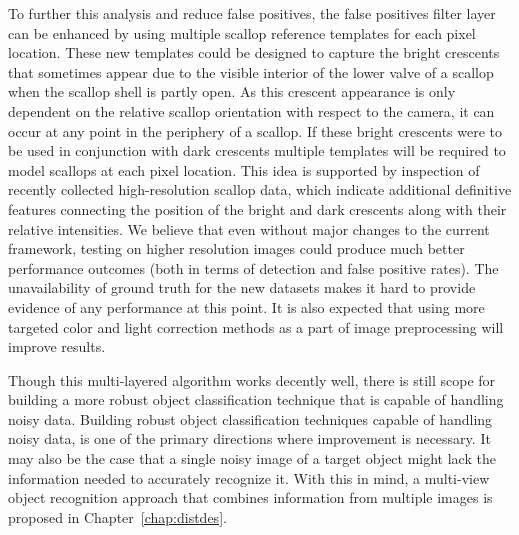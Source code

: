 \documentclass {udthesis}
\begin{document}
To further this analysis and reduce false positives, the false positives filter layer can be enhanced by using multiple scallop reference templates for each pixel location. 
These new templates could be designed to capture the bright crescents that sometimes appear due to the visible interior of the lower valve of a scallop when the scallop shell is partly open. As this crescent appearance is only dependent on the relative scallop orientation with respect to the camera, it can occur at any point in the periphery of a scallop. If these bright crescents were to be used in conjunction with dark crescents multiple templates will be required to model scallops at each pixel location.
This idea is supported by inspection of recently collected high-resolution scallop data, which indicate additional definitive features connecting the position of the bright and dark crescents along with their relative intensities. 
We believe that even without major changes to the current framework, testing on higher resolution images could produce much better performance outcomes (both in terms of detection and false positive rates). 
The unavailability of ground truth for the new datasets makes it hard to provide evidence of any performance at this point. 
It is also expected that using more targeted color and light correction methods \cite{dawkings13} as a part of image preprocessing will improve results.

Though this multi-layered algorithm works decently well, there is still scope for building a more robust object classification technique that is capable of handling noisy data.
Building robust object classification techniques capable of handling noisy data, is one of the primary directions where improvement is necessary. 
It may also be the case that a single noisy image of a target object might lack the information needed to accurately recognize it. With this in mind, a multi-view object recognition approach that combines information from multiple images is proposed in Chapter~\ref{chap:distdes}.


\printglossary[type=\acronymtype]                  
\end{document}
